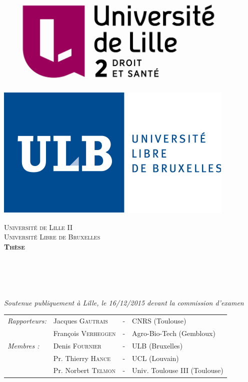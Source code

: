 \documentclass[11pt, oneside]{Thesis} %
\begin{document}
\begin{titlepage}


\begin{center}

\centering
	\includegraphics[width=0.4 \textwidth]{Figures/lille2.png}
    \hfill
    \includegraphics[width=0.3 \textwidth]{Figures/ULB.pdf}


\textsc{\LARGE Université de Lille II \\Université Libre de Bruxelles}\\[1.5cm] %
\textsc{\textbf{\LARGE Thèse}}\\[0.1cm] %

\HRule \\[0.2cm] %
{\huge \bfseries \ttitle}\\[0.2cm] %
\HRule \\[0.2cm] %

 

\begin{center} \large

{\LARGE \bf \authornames} \\

\emph{Soutenue publiquement à Lille, le 16/12/2015 devant la commission d'examen} 
\end{center}

\begin{flushleft} \large

\begin{tabular} {llcl} \large
	\textit {Rapporteurs:} & Jacques \textsc{Gautrais} & - & CNRS (Toulouse) \\ & François \textsc{Verheggen} & - & Agro-Bio-Tech (Gembloux) \\
    
    \textit{Membres :} & Denis \textsc{Fournier} & - & ULB (Bruxelles)\\ & Pr. Thierry \textsc{Hance} & - & UCL (Louvain)\\ & Pr. Norbert \textsc{Telmon} & - & Univ. Toulouse III (Toulouse)\\
    

\end{tabular}
\end{flushleft}
\end{center}
\end{titlepage}
\end{document}
